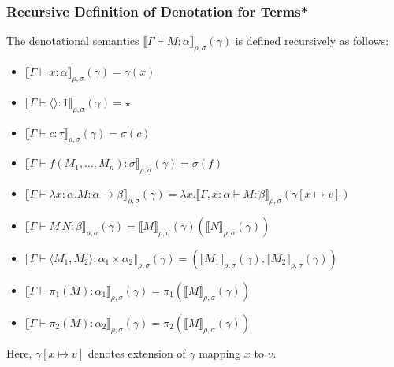 \documentclass[aspectratio=169]{beamer}
\begin{document}
\begin{frame}
\frametitle{Recursive Definition of Denotation for Terms*}

The denotational semantics $\llbracket \Gamma \vdash M : \alpha \rrbracket_{\rho,\sigma} (\gamma)$ is defined recursively as follows:

\begin{itemize}
    \item $\llbracket \Gamma \vdash x : \alpha \rrbracket_{\rho,\sigma} (\gamma) = \gamma(x)$
    \item $\llbracket \Gamma \vdash \langle \rangle : 1 \rrbracket_{\rho,\sigma} (\gamma) = \star$
    \item $\llbracket \Gamma \vdash c : \tau \rrbracket_{\rho,\sigma} (\gamma) = \sigma(c)$
    \item $\llbracket \Gamma \vdash f(M_1, \ldots, M_n) : \sigma \rrbracket_{\rho,\sigma} (\gamma) = \sigma(f)$
    \pause
    \item $\llbracket \Gamma \vdash \lambda x : \alpha. M : \alpha \rightarrow \beta \rrbracket_{\rho,\sigma} (\gamma) = \lambda x. \llbracket \Gamma, x:\alpha \vdash M : \beta \rrbracket_{\rho,\sigma} (\gamma[x \mapsto v])$
    \pause
    \item $\llbracket \Gamma \vdash M \, N : \beta \rrbracket_{\rho,\sigma} (\gamma) = \llbracket M \rrbracket_{\rho,\sigma}(\gamma)(\llbracket N \rrbracket_{\rho,\sigma}(\gamma))$
    \item $\llbracket \Gamma \vdash \langle M_1, M_2 \rangle : \alpha_1 \times \alpha_2 \rrbracket_{\rho,\sigma} (\gamma) = (\llbracket M_1 \rrbracket_{\rho,\sigma}(\gamma), \llbracket M_2 \rrbracket_{\rho,\sigma}(\gamma))$
    \item $\llbracket \Gamma \vdash \pi_1(M) : \alpha_1 \rrbracket_{\rho,\sigma} (\gamma) = \pi_1(\llbracket M \rrbracket_{\rho,\sigma}(\gamma))$
    \item $\llbracket \Gamma \vdash \pi_2(M) : \alpha_2 \rrbracket_{\rho,\sigma} (\gamma) = \pi_2(\llbracket M \rrbracket_{\rho,\sigma}(\gamma))$
\end{itemize}

Here, $\gamma[x \mapsto v]$ denotes extension of $\gamma$ mapping $x$ to $v$.
\end{frame}
\end{document}
